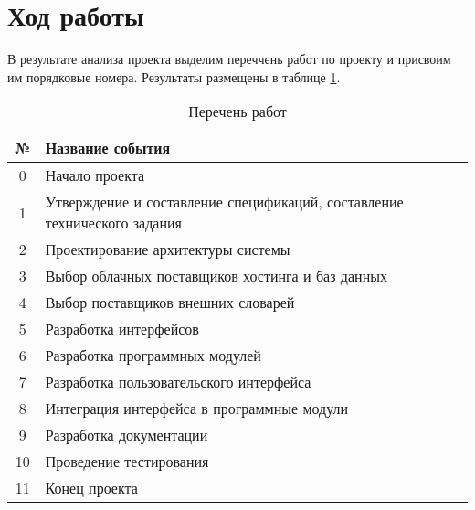 \documentclass[a4paper,14pt]{extarticle}
\begin{document}
\section{Ход работы}
В результате анализа проекта выделим переччень работ по проекту и присвоим им
порядковые номера. Результаты размещены в таблице \ref{tab:tasks}.
\begin{table}[H]
    \caption{Перечень работ}
    \begin{tabular}{ | c | p{14.5cm} | }
        \hline
        № & \textbf{Название события} \\ \hline
        0 & Начало проекта \\ \hline
        1 & Утверждение и составление спецификаций, составление технического задания \\ \hline
        2 & Проектирование архитектуры системы \\ \hline
        3 & Выбор облачных поставщиков хостинга и баз данных \\ \hline
        4 & Выбор поставщиков внешних словарей \\ \hline
        5 & Разработка интерфейсов \\ \hline
        6 & Разработка программных модулей \\ \hline
        7 & Разработка пользовательского интерфейса \\ \hline
        8 & Интеграция интерфейса в программные модули \\ \hline
        9 & Разработка документации \\ \hline
        10 & Проведение тестирования \\ \hline
        11 & Конец проекта \\ \hline
    \end{tabular}
    \label{tab:tasks}
\end{table}
\end{document}
